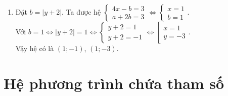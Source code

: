 \begin{bt}
{\begin{enumerate}
			Vậy hệ có nghiệm duy nhất $\left(x;y\right) = \left(1;5\right)$.
			\item 
			Đặt $ b = \big| y+2\big|$. 
			Ta được hệ $\begin{cases} 4x - b = 3\\ a + 2b = 3\end{cases} \Leftrightarrow \begin{cases} x = 1\\ b = 1\end{cases}$. \\
			Với $ b = 1 \Leftrightarrow \big| y+2\big|=1 \Leftrightarrow \begin{cases} y+2 = 1\\ y+2 = -1\end{cases} \Leftrightarrow \left[\begin{array}{l}x = 1\\ y = -3 \end{array}\right. $.\\
			Vậy hệ có là $\left(1;-1\right)$, $\left(1;-3\right)$.
		\end{enumerate}
	} 
\end{bt}

\section{Hệ phương trình chứa tham số}

